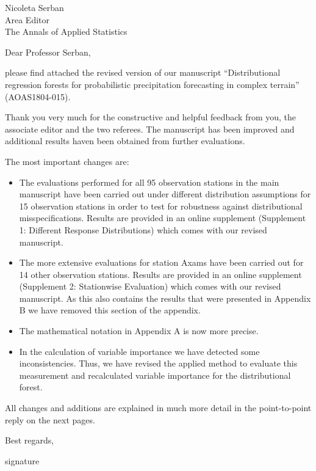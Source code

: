 \documentclass[american,foldmarks=false,noconfig]{uibklttr}
\begin{document}
\begin{letter}{
Nicoleta Serban\\
Area Editor\\
The Annals of Applied Statistics}



\opening{Dear Professor Serban,}

please find attached the revised version of our manuscript 
``Distributional regression forests for probabilistic precipitation 
forecasting in complex terrain'' (AOAS1804-015).

Thank you very much for the constructive and helpful feedback from you, 
the associate editor and the two referees. The manuscript has been 
improved and additional results haven been obtained from further evaluations.

The most important changes are:
\begin{itemize}

\item The evaluations performed for all 95 observation stations 
in the main manuscript have been carried out under different 
distribution assumptions for 15 observation stations in order to 
test for robustness against distributional misspecifications. 
Results are provided in an online supplement 
(Supplement 1: Different Response Distributions) 
which comes with our revised manuscript.

\item The more extensive evaluations for station Axams have been 
carried out for 14 other observation stations. Results are 
provided in an online supplement (Supplement 2: Stationwise Evaluation)
which comes with our revised manuscript. As this also contains
the results that were presented in Appendix B we have removed this
section of the appendix.

\item The mathematical notation in Appendix A is now more precise.

\item In the calculation of variable importance we have detected some inconsistencies.
Thus, we have revised the applied method to evaluate this measurement and recalculated
variable importance for the distributional forest.

\end{itemize}

All changes and additions are explained in much more detail in the
point-to-point reply on the next pages. 

\closing{Best regards,
\vspace*{1cm}
}

\vspace*{-2.8cm}
\hspace*{-0.3cm}signature %

\end{letter}
\end{document}
